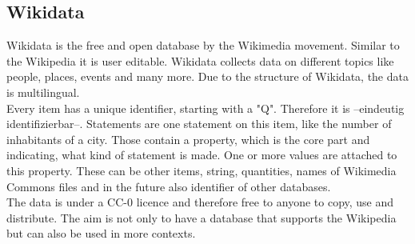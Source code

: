 \subsection{Wikidata}
Wikidata is the free and open database by the Wikimedia movement. Similar to the Wikipedia it is user editable. Wikidata collects data on different topics like people, places, events and many more. Due to the structure of Wikidata, the data is multilingual. \\
 Every item has a unique identifier, starting with a "Q". Therefore it is --eindeutig identifizierbar--. Statements are one statement on this item, like the number of inhabitants of a city. Those contain a property, which is the core part and indicating, what kind of statement is made. One or more values are attached to this property. These can be other items, string, quantities, names of Wikimedia Commons files and in the future also identifier of other databases.  \\
The data is under a CC-0 licence and therefore free to anyone to copy, use and distribute. 
The aim is not only to have a database that supports the Wikipedia but can also be used in more contexts. 